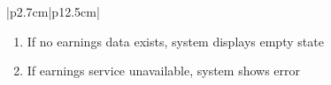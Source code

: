 \begin{table}[H]
\begin{tabular}{|p{2.7cm}|p{12.5cm}|}
\begin{minipage}[t]{\linewidth}
\begin{enumerate}[topsep=0pt,itemsep=1pt,parsep=0pt,partopsep=0pt]
                                          \item If no earnings data exists, system displays empty state
                                          \item If earnings service unavailable, system shows error
                                      \end{enumerate}
                                  \end{minipage} \\
        \hline
    \end{tabular}
    \label{tab:teacher-earnings-summary}
\end{table}


\fi
